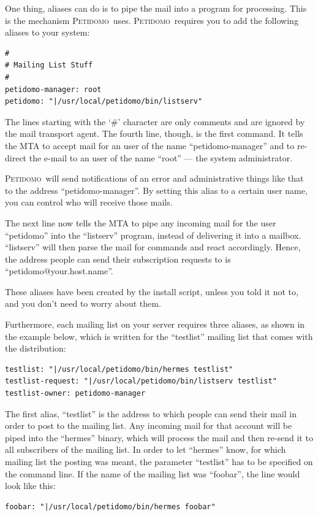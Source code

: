\documentclass[a4paper]{report}
\newcommand{\Petidomo}{{\scshape Peti\-domo}}
\begin{document}
One thing, aliases can do is to pipe the mail into a program for
processing. This is the mechanism \Petidomo\ uses. \Petidomo\ requires
you to add the following aliases to your system:
\begin{verbatim}
#
# Mailing List Stuff
#
petidomo-manager: root
petidomo: "|/usr/local/petidomo/bin/listserv"
\end{verbatim}

The lines starting with the `\#' character are only comments and are
ignored by the mail transport agent. The fourth line, though, is the
first command. It tells the MTA to accept mail for an user of the name
``petidomo-manager'' and to re-direct the e-mail to an user of the
name ``root'' --- the system administrator.

\Petidomo\ will send notifications of an error and administrative
things like that to the address ``petidomo-manager''. By setting this
alias to a certain user name, you can control who will receive those
mails.

The next line now tells the MTA to pipe any incoming mail for the user
``petidomo'' into the ``listserv'' program, instead of delivering it
into a mailbox. ``listserv'' will then parse the mail for commands and
react accordingly. Hence, the address people can send their
subscription requests to is ``petidomo@your.host.name''.

These aliases have been created by the install script, unless you told
it not to, and you don't need to worry about them.

\bigskip

Furthermore, each mailing list on your server requires three aliases,
as shown in the example below, which is written for the ``testlist''
mailing list that comes with the distribution:
\begin{verbatim}
testlist: "|/usr/local/petidomo/bin/hermes testlist"
testlist-request: "|/usr/local/petidomo/bin/listserv testlist"
testlist-owner: petidomo-manager
\end{verbatim}

The first alias, ``testlist'' is the address to which people can send
their mail in order to post to the mailing list. Any incoming mail for
that account will be piped into the ``hermes'' binary, which will
process the mail and then re-send it to all subscribers of the mailing
list. In order to let ``hermes'' know, for which mailing list the
posting was meant, the parameter ``testlist'' has to be specified on
the command line. If the name of the mailing list was ``foobar'', the
line would look like this:
\begin{verbatim}
foobar: "|/usr/local/petidomo/bin/hermes foobar"
\end{verbatim}
\end{document}
